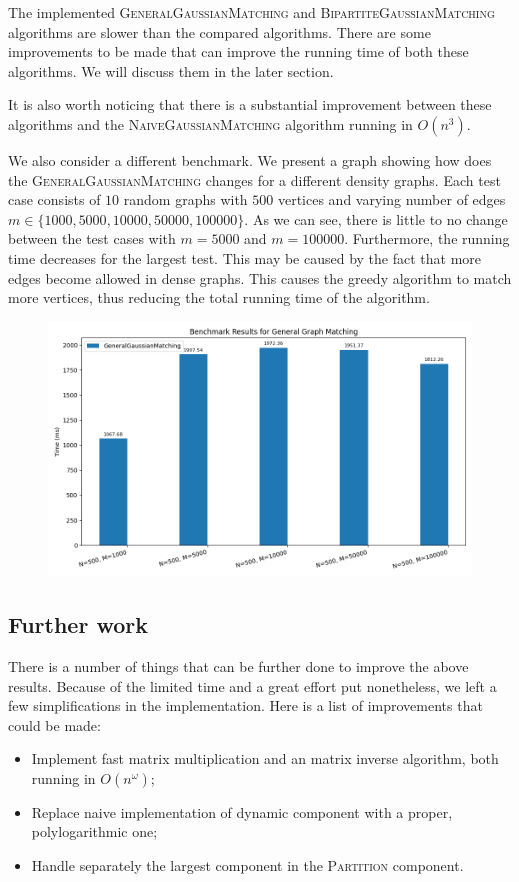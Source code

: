 The implemented \textsc{GeneralGaussianMatching} and \textsc{BipartiteGaussianMatching} algorithms are slower than the compared algorithms. There are some improvements to be made that can improve the running time of both these algorithms. We will discuss them in the later section.

It is also worth noticing that there is a substantial improvement between these algorithms and the \textsc{NaiveGaussianMatching} algorithm running in $O(n^3)$.

We also consider a different benchmark. We present a graph showing how does the \textsc{GeneralGaussianMatching} changes for a different density graphs. Each test case consists of $10$ random graphs with $500$ vertices and varying number of edges $m\in\{1000,5000,10000,50000,100000\}$. As we can see, there is little to no change between the test cases with $m = 5000$ and $m = 100000$. Furthermore, the running time decreases for the largest test. This may be caused by the fact that more edges become allowed in dense graphs. This causes the greedy algorithm to match more vertices, thus reducing the total running time of the algorithm.

\begin{figure}[H]
\centering\includegraphics[width=\linewidth]{4_implementation/plots/plot_gen_matching_2.png}
\end{figure}

\subsection{Further work}
There is a number of things that can be further done to improve the above results. Because of the limited time and a great effort put nonetheless, we left a few simplifications in the implementation. Here is a list of improvements that could be made:
\begin{itemize}
    \item Implement fast matrix multiplication and an matrix inverse algorithm, both running in $O(n^\omega)$;
    \item Replace naive implementation of dynamic component with a proper, polylogarithmic one;
    \item Handle separately the largest component in the \textsc{Partition} component.
\end{itemize}

